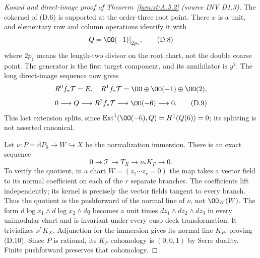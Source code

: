 \begin{proof}[Koszul and direct-image proof of Theorem~\ref{fam:st:A.5.2} (source INV D1.3)]
The cokernel of (D.6) is supported at the order-three root point. There
$x$ is a unit, and elementary row and column operations identify it
with
\[
 Q=\OO(-1)\big|_{2p_1},                               \tag{D.8}
\]
where $2p_1$ means the length-two divisor on the root chart, not the
double coarse point. The generator is the first target component,
and its annihilator is $y^2$. The long direct-image sequence now gives
\[
 R^0\bar f_*\mathcal T=E,\quad
 R^1\bar f_*\mathcal T=\OO\oplus\OO(-1)\oplus\OO(2),
\]
\[
 0\longrightarrow Q\longrightarrow R^2\bar f_*\mathcal T
 \longrightarrow\OO(-6)\longrightarrow0.              \tag{D.9}
\]
This last extension splits, since $\operatorname{Ext}^1(\OO(-6),Q)
=H^1(Q(6))=0$; its splitting is not asserted canonical.

Let $\nu:P=\mathrm dP_6\to W\hookrightarrow X$ be the normalization
immersion. There is an exact sequence
\[
 0\longrightarrow\mathcal T\longrightarrow T_X
 \longrightarrow\nu_*K_P\longrightarrow0.             \tag{D.10}
\]
To verify the quotient, in a chart $W=(z_1\cdots z_r=0)$ the map takes
a vector field to its normal coefficient on each of the $r$ separate
branches. The coefficients lift independently; its kernel is precisely
the vector fields tangent to every branch. Thus the quotient is the
pushforward of the normal line of $\nu$, not $\OO_W(W)$.
The form $d\log x_1\wedge d\log x_2\wedge dq$ becomes a unit times
$dz_1\wedge dz_2\wedge dz_3$ in every unimodular chart and is invariant
under every cusp deck transformation. It trivializes $\nu^*K_X$.
Adjunction for the immersion gives its normal line $K_P$, proving
(D.10). Since $P$ is rational, its $K_P$ cohomology is $(0,0,1)$ by
Serre duality. Finite pushforward preserves that cohomology.


\end{proof}
